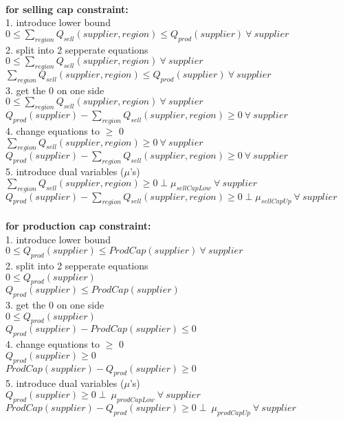 \documentclass{article}
\begin{document}
\hfill\\
\textbf{for	selling cap constraint: }\\
1. introduce lower bound\\
\quad	$0 \leq \sum_{region} Q_{sell}(supplier, region)  \leq Q_{prod}(supplier) \: \forall \: supplier$\\
2. split into 2 sepperate equations\\
\quad$0 \leq \sum_{region} Q_{sell}(supplier, region) \: \forall \: supplier $\\
\quad$\sum_{region} Q_{sell}(supplier, region) \leq Q_{prod}(supplier) \: \forall \: supplier$\\
3. get the 0 on one side\\
\quad$0 \leq \sum_{region} Q_{sell}(supplier, region) \: \forall \: supplier $\\
\quad$Q_{prod}(supplier)  - \sum_{region} Q_{sell}(supplier, region) \geq 0\: \forall \: supplier$\\
4. change equations to $\geq$ 0\\
\quad$ \sum_{region} Q_{sell}(supplier, region) \geq 0 \: \forall \: supplier $\\
\quad$Q_{prod}(supplier)  - \sum_{region} Q_{sell}(supplier, region) \geq 0\: \forall \: supplier$\\
5. introduce dual variables ($\mu$'s)\\
\quad$ \sum_{region} Q_{sell}(supplier, region) \geq 0 \perp \mu_{sellCapLow} \: \forall \: supplier $\\
\quad$Q_{prod}(supplier)  - \sum_{region} Q_{sell}(supplier, region) \geq 0  \perp \mu_{sellCapUp}\: \forall \: supplier$\\


\hfill\\
\textbf{for	production cap constraint: }\\
1. introduce lower bound\\
\quad$0 \leq Q_{prod}(supplier) \leq ProdCap(supplier) \: \forall \: supplier$\\  
2. split into 2 sepperate equations\\
\quad$0 \leq Q_{prod}(supplier) $\\  
\quad$Q_{prod}(supplier) \leq ProdCap(supplier)$\\
3. get the 0 on one side\\
\quad$0 \leq Q_{prod}(supplier) $\\  
\quad$Q_{prod}(supplier) - ProdCap(supplier)\leq 0$\\
4. change equations to $\geq$ 0\\
\quad$Q_{prod}(supplier) \geq 0 $\\  
\quad$ProdCap(supplier) - Q_{prod}(supplier) \geq 0$\\
5. introduce dual variables ($\mu$'s)\\
\quad$Q_{prod}(supplier) \geq 0 \perp\: \mu_{prodCapLow} \: \forall \: supplier$\\
\quad$ProdCap(supplier) - Q_{prod}(supplier) \geq 0 \perp\: \mu_{prodCapUp} \: \forall \: supplier$\\
\end{document}
